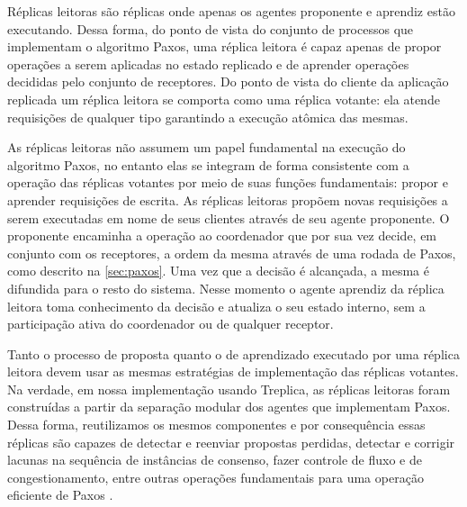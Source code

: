 Réplicas leitoras são réplicas onde apenas os agentes proponente e aprendiz estão
executando. Dessa forma, do ponto de vista do conjunto de processos que implementam o
algoritmo Paxos, uma réplica leitora é capaz apenas de propor operações a serem aplicadas
no estado replicado e de aprender operações decididas pelo conjunto de receptores. Do
ponto de vista do cliente da aplicação replicada um réplica leitora se comporta como uma
réplica votante: ela atende requisições de qualquer tipo garantindo a execução atômica das
mesmas.

As réplicas leitoras não assumem um papel fundamental na execução do algoritmo Paxos, no
entanto elas se integram de forma consistente com a operação das réplicas votantes por
meio de suas funções fundamentais: propor e aprender requisições de escrita. As réplicas
leitoras propõem novas requisições a serem executadas em nome de seus clientes através de
seu agente proponente. O proponente encaminha a operação ao coordenador que por sua vez
decide, em conjunto com os receptores, a ordem da mesma através de uma rodada de Paxos,
como descrito na \autoref{sec:paxos}. Uma vez que a decisão é alcançada, a mesma é
difundida para o resto do sistema. Nesse momento o agente aprendiz da réplica leitora toma
conhecimento da decisão e atualiza o seu estado interno, sem a participação ativa do
coordenador ou de qualquer receptor.

Tanto o processo de proposta quanto o de aprendizado executado por uma réplica leitora
devem usar as mesmas estratégias de implementação das réplicas votantes. Na verdade, em
nossa implementação usando Treplica, as réplicas leitoras foram construídas a partir da
separação modular dos agentes que implementam Paxos. Dessa forma, reutilizamos os mesmos
componentes e por consequência essas réplicas são capazes de detectar e reenviar propostas
perdidas, detectar e corrigir lacunas na sequência de instâncias de consenso, fazer
controle de fluxo e de congestionamento, entre outras operações fundamentais para uma
operação eficiente de Paxos \cite{vieira-tr10b}.

